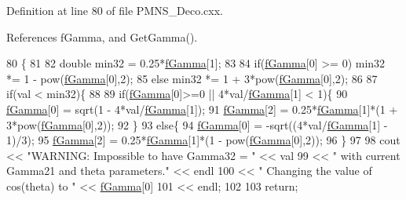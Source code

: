 Definition at line 80 of file P\+M\+N\+S\+\_\+\+Deco.\+cxx.



References f\+Gamma, and Get\+Gamma().


\begin{DoxyCode}
80                                     \{
81 
82   \textcolor{keywordtype}{double} min32 = 0.25*\hyperlink{classOscProb_1_1PMNS__Deco_ae2f30ac9f8b25344959f1698616d337a}{fGamma}[1];
83 
84   \textcolor{keywordflow}{if}(\hyperlink{classOscProb_1_1PMNS__Deco_ae2f30ac9f8b25344959f1698616d337a}{fGamma}[0] >= 0) min32 *= 1 - pow(\hyperlink{classOscProb_1_1PMNS__Deco_ae2f30ac9f8b25344959f1698616d337a}{fGamma}[0],2);
85   \textcolor{keywordflow}{else}               min32 *= 1 + 3*pow(\hyperlink{classOscProb_1_1PMNS__Deco_ae2f30ac9f8b25344959f1698616d337a}{fGamma}[0],2);
86   
87   \textcolor{keywordflow}{if}(val < min32)\{
88     
89     \textcolor{keywordflow}{if}(\hyperlink{classOscProb_1_1PMNS__Deco_ae2f30ac9f8b25344959f1698616d337a}{fGamma}[0]>=0 || 4*val/\hyperlink{classOscProb_1_1PMNS__Deco_ae2f30ac9f8b25344959f1698616d337a}{fGamma}[1] < 1)\{
90       \hyperlink{classOscProb_1_1PMNS__Deco_ae2f30ac9f8b25344959f1698616d337a}{fGamma}[0] = sqrt(1 - 4*val/\hyperlink{classOscProb_1_1PMNS__Deco_ae2f30ac9f8b25344959f1698616d337a}{fGamma}[1]);
91       \hyperlink{classOscProb_1_1PMNS__Deco_ae2f30ac9f8b25344959f1698616d337a}{fGamma}[2] = 0.25*\hyperlink{classOscProb_1_1PMNS__Deco_ae2f30ac9f8b25344959f1698616d337a}{fGamma}[1]*(1 + 3*pow(\hyperlink{classOscProb_1_1PMNS__Deco_ae2f30ac9f8b25344959f1698616d337a}{fGamma}[0],2));
92     \}
93     \textcolor{keywordflow}{else}\{
94       \hyperlink{classOscProb_1_1PMNS__Deco_ae2f30ac9f8b25344959f1698616d337a}{fGamma}[0] = -sqrt((4*val/\hyperlink{classOscProb_1_1PMNS__Deco_ae2f30ac9f8b25344959f1698616d337a}{fGamma}[1] - 1)/3);
95       \hyperlink{classOscProb_1_1PMNS__Deco_ae2f30ac9f8b25344959f1698616d337a}{fGamma}[2] = 0.25*\hyperlink{classOscProb_1_1PMNS__Deco_ae2f30ac9f8b25344959f1698616d337a}{fGamma}[1]*(1 - pow(\hyperlink{classOscProb_1_1PMNS__Deco_ae2f30ac9f8b25344959f1698616d337a}{fGamma}[0],2));
96     \}
97     
98     cout << \textcolor{stringliteral}{"WARNING: Impossible to have Gamma32 = "}        << val
99          << \textcolor{stringliteral}{" with current Gamma21 and theta parameters."}   << endl
100          << \textcolor{stringliteral}{"         Changing the value of cos(theta) to "} << \hyperlink{classOscProb_1_1PMNS__Deco_ae2f30ac9f8b25344959f1698616d337a}{fGamma}[0] 
101          << endl;
102          
103     \textcolor{keywordflow}{return};

\end{DoxyCode}
